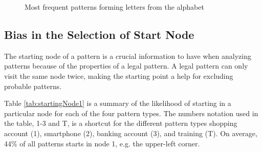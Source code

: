 \begin{figure}[H]

        \vspace{0.5cm}
        \caption{Most frequent patterns forming letters from the alphabet}
        \label{fig:associationpatterns}
      \end{figure}

    \clearpage

  \subsection{Bias in the Selection of Start Node}
  
    The starting node of a pattern is a crucial information to have when analyzing patterns because of the properties of a legal pattern. A legal pattern can only visit the same node twice, making the starting point a help for excluding probable patterns.

    Table \ref{tab:startingNode1} is a summary of the likelihood of starting in a particular node for each of the four pattern types. The numbers notation used in the table, 1-3 and T, is a shortcut for the different pattern types shopping account (1), smartphone (2), banking account (3), and training (T). On average, 44\% of all patterns starts in node 1, e.g. the upper-left corner. 

